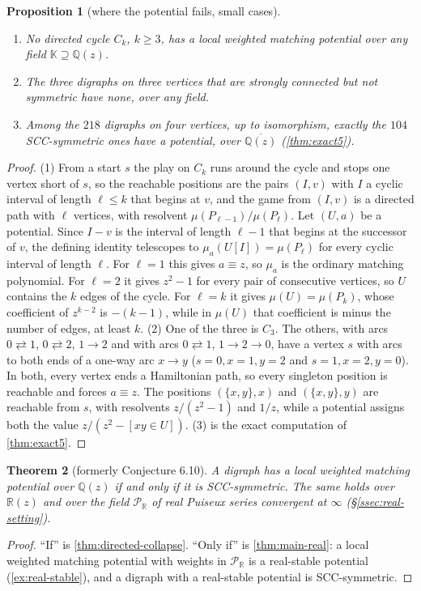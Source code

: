 \documentclass[11pt]{amsart}
\theoremstyle{plain}
\newtheorem{theorem}{Theorem}[section]
\newtheorem{proposition}[theorem]{Proposition}
\theoremstyle{definition}
\theoremstyle{remark}
\numberwithin{equation}{section}
\newcommand{\QQ}{\mathbb{Q}}
\newcommand{\RR}{\mathbb{R}}
\newcommand{\Qz}{\QQ(z)}
\newcommand{\Rz}{\RR(z)}
\newcommand{\Qzbar}{\overline{\QQ(z)}}
\newcommand{\Puis}{\mathcal{P}_{\RR}}
\begin{document}
\begin{proposition}[where the potential fails, small cases]\label{prop:fails}
\begin{enumerate}[label=\textup{(\arabic*)}]
\item No directed cycle $C_k$, $k\ge3$, has a local weighted matching potential over any field $\mathbb K\supseteq\Qz$.
\item The three digraphs on three vertices that are strongly connected but not symmetric have none, over any field.
\item Among the $218$ digraphs on four vertices, up to isomorphism, exactly the $104$ SCC-symmetric ones have a potential, over $\Qzbar$ \textup{(}\cref{thm:exact5}\textup{)}.
\end{enumerate}
\end{proposition}
\begin{proof}
(1) From a start $s$ the play on $C_k$ runs around the cycle and stops one vertex short of $s$, so the reachable positions are the pairs $(I,v)$ with $I$ a cyclic interval of length $\ell\le k$ that begins at $v$, and the game from $(I,v)$ is a directed path with $\ell$ vertices, with resolvent $\mu(P_{\ell-1})/\mu(P_\ell)$. Let $(U,a)$ be a potential. Since $I-v$ is the interval of length $\ell-1$ that begins at the successor of $v$, the defining identity telescopes to $\mu_a(U[I])=\mu(P_\ell)$ for every cyclic interval of length $\ell$. For $\ell=1$ this gives $a\equiv z$, so $\mu_a$ is the ordinary matching polynomial. For $\ell=2$ it gives $z^2-1$ for every pair of consecutive vertices, so $U$ contains the $k$ edges of the cycle. For $\ell=k$ it gives $\mu(U)=\mu(P_k)$, whose coefficient of $z^{k-2}$ is $-(k-1)$, while in $\mu(U)$ that coefficient is minus the number of edges, at least $k$.
(2) One of the three is $C_3$. The others, with arcs $0\rightleftarrows1$, $0\rightleftarrows2$, $1\to2$ and with arcs $0\rightleftarrows1$, $1\to2\to0$, have a vertex $s$ with arcs to both ends of a one-way arc $x\to y$ ($s=0,x=1,y=2$ and $s=1,x=2,y=0$). In both, every vertex ends a Hamiltonian path, so every singleton position is reachable and forces $a\equiv z$. The positions $(\{x,y\},x)$ and $(\{x,y\},y)$ are reachable from $s$, with resolvents $z/(z^2-1)$ and $1/z$, while a potential assigns both the value $z/(z^2-[xy\in U])$.
(3) is the exact computation of \cref{thm:exact5}.
\end{proof}

\begin{theorem}[formerly Conjecture 6.10]\label{thm:conj610}
A digraph has a local weighted matching potential over $\Qz$ if and only if it is SCC-symmetric. The same holds over $\Rz$ and over the field $\Puis$ of real Puiseux series convergent at $\infty$ \textup{(}\S\ref{ssec:real-setting}\textup{)}.
\end{theorem}
\begin{proof}
``If'' is \cref{thm:directed-collapse}. ``Only if'' is \cref{thm:main-real}: a local weighted matching potential with weights in $\Puis$ is a real-stable potential (\cref{ex:real-stable}), and a digraph with a real-stable potential is SCC-symmetric.
\end{proof}
\end{document}

